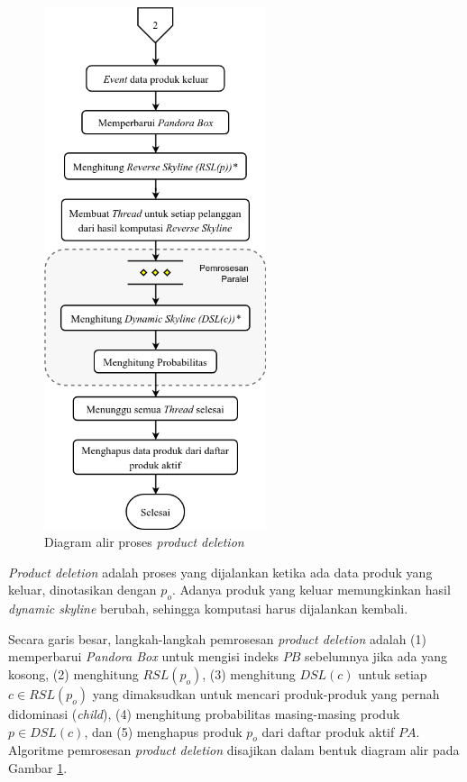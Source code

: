 \begin{figure}[H]
	\centering
	\includegraphics[width=6.5cm]{assets/img/bab3/flowchart-po.png}
	\caption{Diagram alir proses \textit{product deletion}}
	\label{fig:flowchart-po}
\end{figure}


\textit{Product deletion} adalah proses yang dijalankan ketika ada data produk yang keluar, dinotasikan dengan $p_{o}$. Adanya produk yang keluar memungkinkan hasil \textit{dynamic skyline} berubah, sehingga komputasi harus dijalankan kembali. 

Secara garis besar, langkah-langkah pemrosesan \textit{product deletion} adalah (1) memperbarui \textit{Pandora Box} untuk mengisi indeks $PB$ sebelumnya jika ada yang kosong, (2) menghitung $RSL(p_{o})$, (3) menghitung $DSL(c)$ untuk setiap $c \in RSL(p_{o})$ yang dimaksudkan untuk mencari produk-produk yang pernah didominasi (\textit{child}), (4) menghitung probabilitas masing-masing produk $p \in DSL(c)$, dan (5) menghapus produk $p_{o}$ dari daftar produk aktif $PA$. Algoritme pemrosesan \textit{product deletion} disajikan dalam bentuk diagram alir pada Gambar \ref{fig:flowchart-po}.

